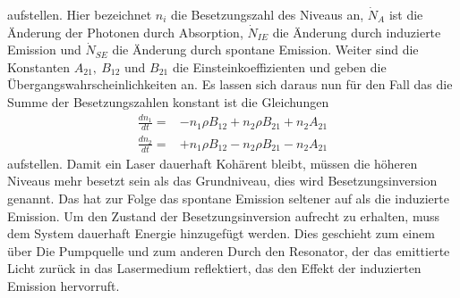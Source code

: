 aufstellen. Hier bezeichnet $n_i$ die Besetzungszahl des Niveaus an, $\dot{N}_A$ ist die Änderung der Photonen durch Absorption, $\dot{N}_{IE}$ die Änderung durch induzierte Emission und $\dot{N}_{SE}$ die Änderung durch spontane Emission.
Weiter sind die Konstanten $A_{21},\ B_{12}$ und $B_{21}$ die Einsteinkoeffizienten und geben die Übergangswahrscheinlichkeiten an.
Es lassen sich daraus nun für den Fall das die Summe der Besetzungszahlen konstant ist die Gleichungen
\begin{align}
	\frac{dn_1}{dt}=&-n_1\rho B_{12}+n_2\rho B_{21}+n_2A_{21}\\
	\frac{dn_2}{dt}=&+n_1\rho B_{12}- n_2\rho B_{21}-n_2A_{21}
\end{align}
aufstellen.
Damit ein Laser dauerhaft Kohärent bleibt, müssen die höheren Niveaus mehr besetzt sein als das Grundniveau, dies wird Besetzungsinversion genannt. 
Das hat zur Folge das spontane Emission seltener auf als die induzierte  Emission.
Um den Zustand der Besetzungsinversion aufrecht zu erhalten, muss dem System dauerhaft Energie hinzugefügt werden.
Dies geschieht zum einem über Die Pumpquelle und zum anderen Durch den Resonator, der das emittierte Licht zurück in das Lasermedium reflektiert, das den Effekt der induzierten Emission hervorruft.
